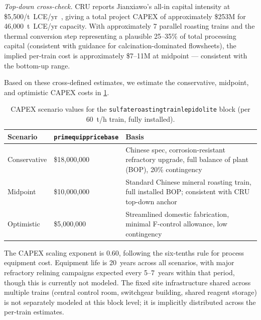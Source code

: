 \documentclass{article}
\renewcommand\_{\textunderscore\allowbreak}
\begin{document}
\textit{Top-down cross-check.} CRU reports Jianxiawo's all-in capital intensity at \$5,500/t~LCE/yr~\cite{zhangChinaHasDomestic2025}, giving a total project CAPEX of approximately \$253M for 46,000~t~LCE/yr capacity. With approximately 7 parallel roasting trains and the thermal conversion step representing a plausible 25--35\% of total processing capital (consistent with \citet{petersPlantDesignEconomics1991} guidance for calcination-dominated flowsheets), the implied per-train cost is approximately \$7--11M at midpoint --- consistent with the bottom-up range.

Based on these cross-defined estimates, we estimate the conservative, midpoint, and optimistic CAPEX costs in \ref{tab:c-sulfateroastingtrainlepidolite-capex}.
 
\begin{table}[h!]
\caption[CAPEX scenario values for the \texttt{sulfate\_roasting\_train\_lepidolite} block.]{CAPEX scenario values for the \texttt{sulfate\_roasting\_train\_lepidolite} block (per 60~t/h train, fully installed).}
\label{tab:c-sulfateroastingtrainlepidolite-capex}

\begin{tabular}{>{\raggedright\arraybackslash}p{2.5cm}
                >{\raggedright\arraybackslash}p{4.3cm}
                >{\raggedright\arraybackslash}p{8.5cm}}
\toprule
\textbf{Scenario} & \texttt{prim\_equip\_price\_base} & \textbf{Basis} \\
\midrule
Conservative & \$18,000,000  & Chinese spec, corrosion-resistant refractory upgrade, full balance of plant (BOP), 20\% contingency \\
Midpoint     & \$10,000,000 & Standard Chinese mineral roasting train, full installed BOP; consistent with CRU top-down anchor \\
Optimistic   & \$5,000,000  & Streamlined domestic fabrication, minimal F-control allowance, low contingency \\
\bottomrule
\end{tabular}
\end{table}

\noindent The CAPEX scaling exponent is 0.60, following the six-tenths rule for process equipment cost. Equipment life is 20~years across all scenarios, with major refractory relining campaigns expected every 5--7~years within that period, though this is currently not modeled. The fixed site infrastructure shared across multiple trains (central control room, switchgear building, shared reagent storage) is not separately modeled at this block level; it is implicitly distributed across the per-train estimates.
\end{document}
